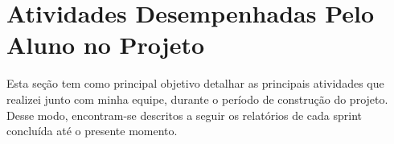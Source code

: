 \section[Atividades Desempenhadas Pelo Aluno no Projeto]{Atividades Desempenhadas Pelo Aluno no Projeto}
Esta seção tem como principal objetivo detalhar as principais atividades que realizei junto com minha equipe, durante o período de construção do projeto. Desse modo, encontram-se descritos a seguir os relatórios de cada sprint concluída até o presente momento. 






